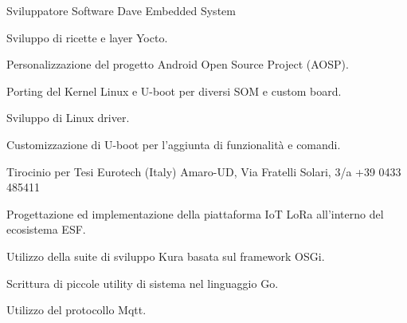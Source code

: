 \documentclass[italian,a4paper]{europasscv}
\begin{document}
\begin{europasscv}

		 {
			Sviluppatore Software Dave Embedded System
		}
		\ecvitem{} {
			\begin{ecvitemize}
				\item Sviluppo di ricette e layer Yocto.
				\item Personalizzazione del progetto Android Open Source Project
					(AOSP).
				\item Porting del Kernel Linux e U-boot per diversi SOM e custom
					board.
				\item Sviluppo di Linux driver.
				\item Customizzazione di U-boot per l'aggiunta di funzionalità
					e comandi.
			\end{ecvitemize}
		}

		 {
			Tirocinio per Tesi
		}
		\ecvitem{} {
			Eurotech (Italy)  Amaro-UD,
			Via Fratelli Solari, 3/a \newline +39 0433 485411
			\newline {}
		}
		\ecvitem{} {
			\begin{ecvitemize}
					\item Progettazione ed implementazione della piattaforma
						IoT LoRa all'interno del ecosistema ESF.
					\item Utilizzo della suite di sviluppo Kura basata sul
						framework OSGi.
					\item Scrittura di piccole utility di sistema nel
						linguaggio Go.
					\item Utilizzo del protocollo Mqtt.
			\end{ecvitemize}
		}


\end{europasscv}
\end{document}
